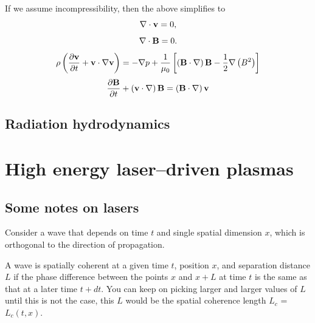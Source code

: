 \documentclass[a4paper,11pt]{report}
\begin{document}
If we assume incompressibility, then the above simplifies to
\begin{equation}
    \nabla \cdot \mathbf{v} = 0,
\end{equation}
\begin{equation}
    \nabla \cdot \mathbf{B} = 0.
    \end{equation}
\begin{equation}
    \rho \left (\frac{\partial \mathbf{v}}{\partial t} + \mathbf{v} \cdot \nabla \mathbf{v} \right ) = - \nabla p  + \frac{1}{\mu_0} \left [ \left ( \mathbf{B} \cdot \nabla \right ) \mathbf{B} - \frac{1}{2} \nabla \left ( B^2 \right ) \right ]
\end{equation}
\begin{equation}
    \frac{\partial \mathbf{B}}{\partial t} + \left ( \mathbf{v} \cdot \nabla \right ) \mathbf{B} = \left ( \mathbf{B} \cdot \nabla \right ) \mathbf{v}
\end{equation}

\chapter{Radiation hydrodynamics}

\part{High energy laser--driven plasmas}

\chapter{Some notes on lasers}
Consider a wave that depends on time $t$ and single spatial dimension $x$, which is orthogonal to the direction of propagation. 

A wave is spatially coherent at a given time $t$, position $x$, and separation distance $L$ if the phase difference between the points $x$ and $x+L$ at time $t$ is the same as that at a later time $t+dt$. You can keep on picking larger and larger values of $L$ until this is not the case, this $L$ would be the spatial coherence length $L_c$ = $L_c(t,x)$.
\end{document}
